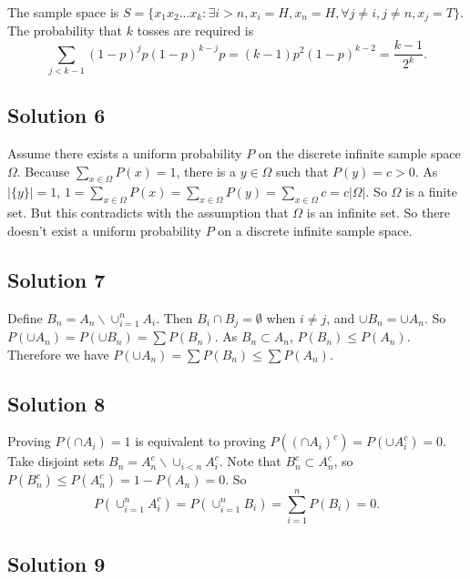 The sample space is $S = \{ x_1 x_2 ... x_k : \exists i > n, x_i = H, x_n = H, \forall j \neq i, j \neq n, x_j = T\}$.
The probability that $k$ tosses are required is
\begin{equation*}
    \sum_{j < k - 1} (1 - p)^j p (1 - p)^{k - j} p
        = (k - 1) p^2 (1 - p)^{k - 2}
        = \frac{k - 1}{2^k}.
\end{equation*}


\subsection*{Solution 6}

Assume there exists a uniform probability $P$ on the discrete infinite sample space $\Omega$.
Because $\sum_{x \in \Omega} P(x) = 1$, there is a $y \in \Omega$ such that $P(y) = c > 0$.
As $|\{y\}| = 1$, $1 = \sum_{x \in \Omega} P(x) = \sum_{x \in \Omega} P(y) = \sum_{x \in \Omega} c = c |\Omega|$.
So $\Omega$ is a finite set.
But this contradicts with the assumption that $\Omega$ is an infinite set.
So there doesn't exist a uniform probability $P$ on a discrete infinite sample space.


\subsection*{Solution 7}

Define $B_n = A_n \backslash \cup_{i = 1}^n A_i$.
Then $B_i \cap B_j = \emptyset$ when $i \neq j$, and $\cup B_n = \cup A_n$.
So $P(\cup A_n) = P(\cup B_n) = \sum P(B_n)$.
As $B_n \subset A_n$, $P(B_n) \leq P(A_n)$.
Therefore we have $P(\cup A_n) = \sum P(B_n) \leq \sum P(A_n)$.


\subsection*{Solution 8}

Proving $P(\cap A_i) = 1$ is equivalent to proving $P((\cap A_i)^c) = P(\cup A_i^c) = 0$.
Take disjoint sets $B_n = A_n^c \backslash \cup_{i < n} A_i^c$.
Note that $B_n^c \subset A_n^c$, so $P(B_n^c) \leq P(A_n^c) = 1 - P(A_n) = 0$.
So
\begin{equation*}
    P(\cup_{i = 1}^n A_i^c)
        = P(\cup_{i = 1}^n B_i)
        = \sum_{i = 1}^n P(B_i)
        = 0.
\end{equation*}


\subsection*{Solution 9}

